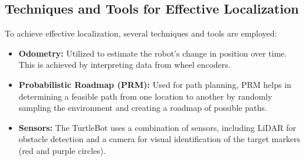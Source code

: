 \documentclass{article}
\begin{document}
	\subsection{Techniques and Tools for Effective Localization}
	To achieve effective localization, several techniques and tools are employed:
	\begin{itemize}
		\item \textbf{Odometry:} Utilized to estimate the robot's change in position over time. This is achieved by interpreting data from wheel encoders.
		\item \textbf{Probabilistic Roadmap (PRM):} Used for path planning, PRM helps in determining a feasible path from one location to another by randomly sampling the environment and creating a roadmap of possible paths.
		\item \textbf{Sensors:} The TurtleBot uses a combination of sensors, including LiDAR for obstacle detection and a camera for visual identification of the target markers (red and purple circles).
	\end{itemize}
\end{document}
